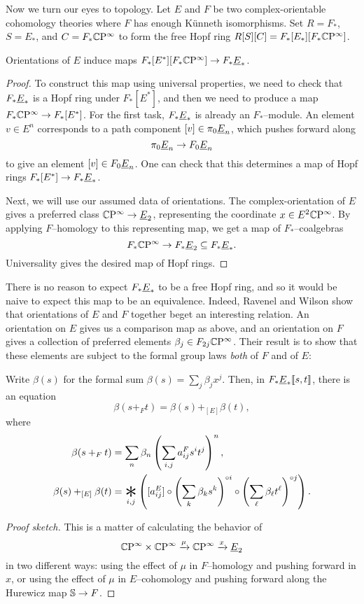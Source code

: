 Now we turn our eyes to topology.  Let $E$ and $F$ be two complex-orientable cohomology theories where $F$ has enough K\"unneth isomorphisms.  Set $R = F_*$, $S = E_*$, and $C = F_* \CP^\infty$ to form the free Hopf ring $R[S][C] = F_*[E_*][F_* \CP^\infty]$.
\begin{lemma}
Orientations of $E$ induce maps $F_*[E^*][F_* \CP^\infty] \to F_* \OS{E}{*}$.
\end{lemma}
\begin{proof}
To construct this map using universal properties, we need to check that $F_* \OS{E}{*}$ is a Hopf ring under $F_*[E^*]$, and then we need to produce a map $F_* \CP^\infty \to F_*[E^*]$.  For the first task, $F_* \OS{E}{*}$ is already an $F_*$--module.  An element $v \in E^n$ corresponds to a path component $[v] \in \pi_0 \OS{E}{n}$, which pushes forward along \[\pi_0 \OS{E}{n} \to F_0 \OS{E}{n}\] to give an element $[v] \in F_0 \OS{E}{n}$.  One can check that this determines a map of Hopf rings $F_*[E^*] \to F_* \OS{E}{*}$.

Next, we will use our assumed data of orientations.  The complex-orientation of $E$ gives a preferred class $\CP^\infty \to \OS{E}{2}$, representing the coordinate $x \in E^2 \CP^\infty$.  By applying $F$--homology to this representing map, we get a map of $F_*$--coalgebras \[F_* \CP^\infty \to F_* \OS{E}{2} \subseteq F_* \OS{E}{*}.\]  Universality gives the desired map of Hopf rings.
\end{proof}

There is no reason to expect $F_* \OS{E}{*}$ to be a free Hopf ring, and so it would be naive to expect this map to be an equivalence.  Indeed, Ravenel and Wilson show that orientations of $E$ and $F$ together beget an interesting relation.  An orientation on $E$ gives us a comparison map as above, and an orientation on $F$ gives a collection of preferred elements $\beta_j \in F_{2j} \CP^\infty$.  Their result is to show that these elements are subject to the formal group laws \emph{both} of $F$ and of $E$:
\begin{theorem}\label{UnstableRWRelation}
Write $\beta(s)$ for the formal sum $\beta(s) = \sum_j \beta_j x^j$.  Then, in $F_* \OS{E}{*}\ps{s, t}$, there is an equation \[\beta(s +_F t) = \beta(s) +_{[E]} \beta(t),\] where
\begin{align*}
\beta(s +_F t) & = \sum_n \beta_n \left(\sum_{i, j} a_{ij}^F s^i t^j \right)^n, \\
\beta(s) +_{[E]} \beta(t) & = \bigast_{i, j} \left([a_{ij}^E] \circ \left( \sum_k \beta_k s^k \right)^{\circ i} \circ \left( \sum_\ell \beta_\ell t^\ell \right)^{\circ j} \right).
\end{align*}
\end{theorem}
\begin{proof}[Proof sketch]
This is a matter of calculating the behavior of \[\CP^\infty \times \CP^\infty \xrightarrow{\mu} \CP^\infty \xrightarrow{x} \OS{E}{2}\] in two different ways: using the effect of $\mu$ in $F$--homology and pushing forward in $x$, or using the effect of $\mu$ in $E$--cohomology and pushing forward along the Hurewicz map $\S \to F$.
\end{proof}

